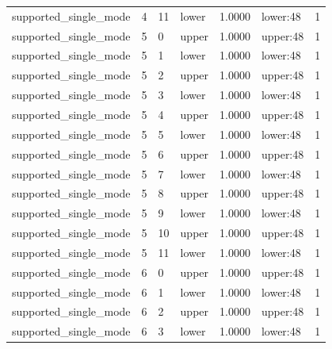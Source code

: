 \documentclass{article}
\begin{document}
\begin{table}[tbp]
{\begin{tabular}{lllllll}
supported\_single\_mode & 4 & 11 & lower & 1.0000 & lower:48 & 1 \\
supported\_single\_mode & 5 & 0 & upper & 1.0000 & upper:48 & 1 \\
supported\_single\_mode & 5 & 1 & lower & 1.0000 & lower:48 & 1 \\
supported\_single\_mode & 5 & 2 & upper & 1.0000 & upper:48 & 1 \\
supported\_single\_mode & 5 & 3 & lower & 1.0000 & lower:48 & 1 \\
supported\_single\_mode & 5 & 4 & upper & 1.0000 & upper:48 & 1 \\
supported\_single\_mode & 5 & 5 & lower & 1.0000 & lower:48 & 1 \\
supported\_single\_mode & 5 & 6 & upper & 1.0000 & upper:48 & 1 \\
supported\_single\_mode & 5 & 7 & lower & 1.0000 & lower:48 & 1 \\
supported\_single\_mode & 5 & 8 & upper & 1.0000 & upper:48 & 1 \\
supported\_single\_mode & 5 & 9 & lower & 1.0000 & lower:48 & 1 \\
supported\_single\_mode & 5 & 10 & upper & 1.0000 & upper:48 & 1 \\
supported\_single\_mode & 5 & 11 & lower & 1.0000 & lower:48 & 1 \\
supported\_single\_mode & 6 & 0 & upper & 1.0000 & upper:48 & 1 \\
supported\_single\_mode & 6 & 1 & lower & 1.0000 & lower:48 & 1 \\
supported\_single\_mode & 6 & 2 & upper & 1.0000 & upper:48 & 1 \\
supported\_single\_mode & 6 & 3 & lower & 1.0000 & lower:48 & 1 \\
\bottomrule
\end{tabular}
}
\end{table}

\clearpage
\end{document}
